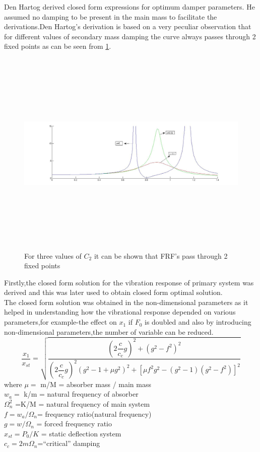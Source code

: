 Den Hartog derived closed form expressions for optimum damper parameters. He assumed no damping to be present in the main mass to facilitate the derivations.Den Hartog’s derivation is based on a very peculiar observation that for different values of secondary mass damping the curve always passes through 2 fixed points as can be seen from \ref{fig:4}.
\begin{figure}[h]
\includegraphics[width=16cm,height=10cm]{"figures/4"}
\caption{For three values of $C_{2}$ it can be shown that FRF's pass through 2 fixed points}
  \label{fig:4}
\end{figure}
Firstly,the closed form solution for the vibration response of  primary system was derived and this was later used to obtain closed form optimal solution.\\The closed form solution was obtained in the non-dimensional parameters as it helped in understanding how the vibrational response depended on various parameters,for example-the effect on $x_1$ if $F_0$ is doubled and also by introducing non-dimensional parameters,the number of variable can be reduced.
$$
\dfrac{x_1}{x_{st}} = \sqrt{\dfrac{(2\dfrac{c}{c_c}g)^2 + (g^2 - f^2)^2}{(2\dfrac{c}{c_c}g)^2 (g^2 -1 + \mu g^2)^2 + [\mu f^2 g^2 - (g^2 -1)(g^2-f^2)]^2}} 
$$
where 
$\mu = $ m/M =  absorber mass / main mass \\
$w_a = $ k/m =  natural frequency of absorber \\
$\Omega_n^2 $ =K/M = natural frequency of main system\\
$f =w_a/\Omega_n$= frequency ratio(natural frequency)\\
$g = w/\Omega_n$ = forced frequency ratio \\
$x_{st} = P_0/K$ = static deflection system \\
$c_c = 2m\Omega_n $=``critical''   damping\\

